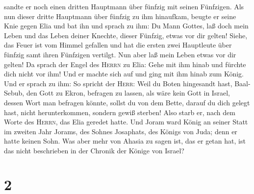 sandte er noch einen dritten Hauptmann über fünfzig mit seinen
Fünfzigen. Als nun dieser dritte Hauptmann über fünfzig zu ihm
hinaufkam, beugte er seine Knie gegen Elia und bat ihn und sprach zu
ihm: Du Mann Gottes, laß doch mein Leben und das Leben deiner Knechte,
dieser Fünfzig, etwas vor dir gelten!  Siehe, das Feuer
ist vom Himmel gefallen und hat die ersten zwei Hauptleute über fünfzig
samt ihren Fünfzigen vertilgt. Nun aber laß mein Leben etwas vor dir
gelten!  Da sprach der Engel des \textsc{Herrn} zu Elia:
Gehe mit ihm hinab und fürchte dich nicht vor ihm! Und er machte sich
auf und ging mit ihm hinab zum König.  Und er sprach zu
ihm: So spricht der \textsc{Herr}: Weil du Boten hingesandt hast,
Baal-Sebub, den Gott zu Ekron, befragen zu lassen, als wäre kein Gott in
Israel, dessen Wort man befragen könnte, sollst du von dem Bette, darauf
du dich gelegt hast, nicht herunterkommen, sondern gewiß sterben!
 Also starb er, nach dem Worte des \textsc{Herrn}, das
Elia geredet hatte. Und Joram ward König an seiner Statt im zweiten Jahr
Jorams, des Sohnes Josaphats, des Königs von Juda; denn er hatte keinen
Sohn.  Was aber mehr von Ahasia zu sagen ist, das er
getan hat, ist das nicht beschrieben in der Chronik der Könige von
Israel?

\hypertarget{section-1}{%
\section{2}\label{section-1}}

